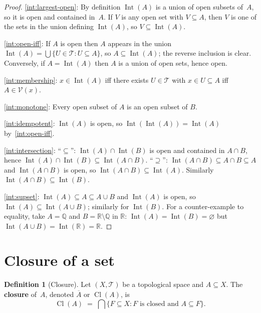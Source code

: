 \documentclass[11pt,a4paper,twoside]{book}
\theoremstyle{remark}
\theoremstyle{definition}
\theoremstyle{definition}
\newtheorem{definition}{Definition}[section]
\newcommand{\Tau}{\mathcal{T}}           %
\newcommand{\cl}[1]{\overline{#1}}       %
\newcommand{\Nbhd}{\mathcal{V}}          %
\newcommand{\R}{\mathbb{R}}
\newcommand{\Q}{\mathbb{Q}}
\DeclareMathOperator{\Int}{Int}
\DeclareMathOperator{\Cl}{Cl}
\begin{document}
\begin{proof}
\ref{int:largest-open}: By definition $\Int(A)$ is a union of open subsets of~$A$, so it is
open and contained in~$A$.  If $V$ is any open set with $V\subseteq A$, then
$V$ is one of the sets in the union defining $\Int(A)$, so
$V\subseteq\Int(A)$.

\ref{int:open-iff}: If $A$ is open then $A$ appears in the union
$\Int(A)=\bigcup\{U\in\Tau:U\subseteq A\}$, so $A\subseteq\Int(A)$; the
reverse inclusion is clear.  Conversely, if $A=\Int(A)$ then $A$ is a union of
open sets, hence open.

\ref{int:membership}: $x\in\Int(A)$ iff there exists $U\in\Tau$ with
$x\in U\subseteq A$ iff $A\in\Nbhd(x)$.

\ref{int:monotone}: Every open subset of $A$ is an open subset of $B$.

\ref{int:idempotent}: $\Int(A)$ is open, so $\Int(\Int(A))=\Int(A)$
by~\ref{int:open-iff}.

\ref{int:intersection}: ``$\subseteq$'': $\Int(A)\cap\Int(B)$ is open and
contained in $A\cap B$, hence $\Int(A)\cap\Int(B)\subseteq\Int(A\cap B)$.
``$\supseteq$'': $\Int(A\cap B)\subseteq A\cap B\subseteq A$ and
$\Int(A\cap B)$ is open, so $\Int(A\cap B)\subseteq\Int(A)$.  Similarly
$\Int(A\cap B)\subseteq\Int(B)$.

\ref{int:supset}: $\Int(A)\subseteq A\subseteq A\cup B$ and $\Int(A)$ is open,
so $\Int(A)\subseteq\Int(A\cup B)$; similarly for $\Int(B)$.  For a
counter-example to equality, take $A=\Q$ and $B=\R\setminus\Q$ in $\R$:
$\Int(A)=\Int(B)=\varnothing$ but $\Int(A\cup B)=\Int(\R)=\R$.
\end{proof}


\section{Closure of a set}
\label{sec:closure}

\begin{definition}[Closure]\label{def:closure}
Let $(X,\Tau)$ be a topological space and $A\subseteq X$.  The
\textbf{closure} of~$A$, denoted $\cl{A}$ or $\Cl(A)$, is
\[
  \Cl(A) \;=\; \bigcap\{F\subseteq X : F\text{ is closed and }A\subseteq F\}.
\]
\end{definition}
\end{document}
